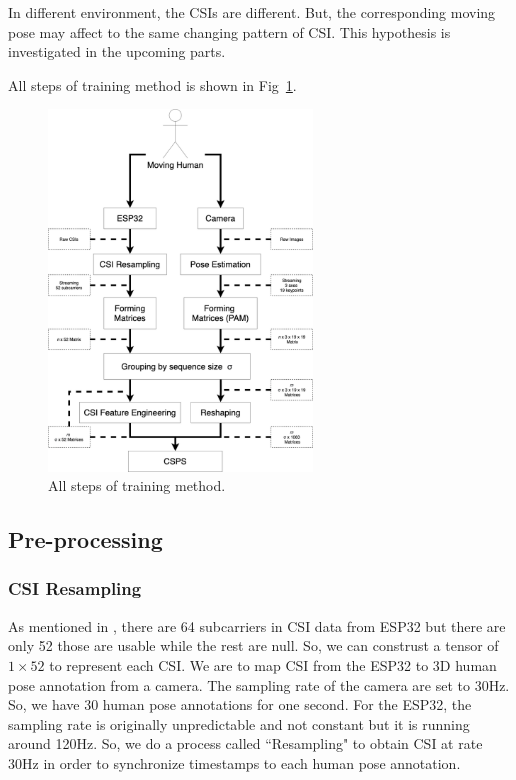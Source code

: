 \documentclass[10pt,letterpaper]{article}
\begin{document}
	In different environment, the CSIs are different. But, the corresponding moving pose may affect to the same changing pattern of CSI. This hypothesis is investigated in the upcoming parts.
	
	
	
	
	
	
	All steps of training method is shown in Fig~\ref{fig:TRAINSTEP}. 
	
	
	\begin{figure}[htbp]
		\centerline{\includegraphics[width=70mm,scale=0.2]{TRAINSTEP06.png}}
		\caption{All steps of training method.}
		\label{fig:TRAINSTEP}
	\end{figure}
	
	
	
	\subsection*{Pre-processing}\label{Processing}
	
	\subsubsection*{CSI Resampling}
	
	
	As mentioned in , there are 64 subcarriers in CSI data from ESP32 but there are only 52 those are usable while the rest are null. So, we can construst a tensor of $1 \times 52$ to represent each CSI. We are to map CSI from the ESP32 to 3D human pose annotation from a camera. The sampling rate of the camera are set to 30Hz. So, we have 30 human pose annotations for one second. For the ESP32, the sampling rate is originally unpredictable and not constant but it is running around 120Hz. So, we do a process called ``Resampling" to obtain CSI at rate 30Hz in order to synchronize timestamps to each human pose annotation.
	
\end{document}
